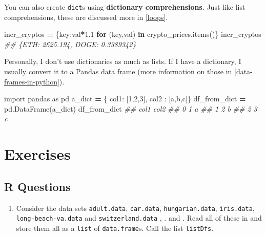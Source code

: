 \documentclass[
  12pt,
  krantz2]{krantz}
\makeatletter
\newenvironment{Shaded}{\begin{snugshade}}{\end{snugshade}}
\newcommand{\CommentTok}[1]{\textcolor[rgb]{0.37,0.37,0.37}{\textit{#1}}}
\newcommand{\ControlFlowTok}[1]{\textcolor[rgb]{0.27,0.27,0.27}{\textbf{#1}}}
\newcommand{\DecValTok}[1]{\textcolor[rgb]{0.06,0.06,0.06}{#1}}
\newcommand{\FloatTok}[1]{\textcolor[rgb]{0.06,0.06,0.06}{#1}}
\newcommand{\ImportTok}[1]{#1}
\newcommand{\KeywordTok}[1]{\textcolor[rgb]{0.27,0.27,0.27}{\textbf{#1}}}
\newcommand{\NormalTok}[1]{#1}
\newcommand{\OperatorTok}[1]{\textcolor[rgb]{0.43,0.43,0.43}{\textbf{#1}}}
\newcommand{\StringTok}[1]{\textcolor[rgb]{0.5,0.5,0.5}{#1}}
\providecommand{\tightlist}{%
  \setlength{\itemsep}{0pt}\setlength{\parskip}{0pt}}
\newenvironment{kframe}{%
\medskip{}
\setlength{\fboxsep}{.8em}
 \def\at@end@of@kframe{}%
 \ifinner\ifhmode%
  \def\at@end@of@kframe{\end{minipage}}%
  \begin{minipage}{\columnwidth}%
 \fi\fi%
 \def\FrameCommand##1{\hskip\@totalleftmargin \hskip-\fboxsep
 \colorbox{shadecolor}{##1}\hskip-\fboxsep
     \hskip-\linewidth \hskip-\@totalleftmargin \hskip\columnwidth}%
 \MakeFramed {\advance\hsize-\width
   \@totalleftmargin\z@ \linewidth\hsize
   \@setminipage}}%
 {\par\unskip\endMakeFramed%
 \at@end@of@kframe}
\renewenvironment{Shaded}{\begin{kframe}}{\end{kframe}}
\makeatother
\begin{document}
You can also create \texttt{dict}s using \textbf{dictionary comprehensions}. Just like list comprehensions, these are discussed more in \ref{loops}.

\begin{Shaded}
\begin{Highlighting}[]
\NormalTok{incr\_cryptos }\OperatorTok{=}\NormalTok{ \{key:val}\OperatorTok{*}\FloatTok{1.1} \ControlFlowTok{for}\NormalTok{ (key,val) }\KeywordTok{in}\NormalTok{ crypto\_prices.items()\}}
\NormalTok{incr\_cryptos}
\CommentTok{\#\# \{\textquotesingle{}ETH\textquotesingle{}: 2625.194, \textquotesingle{}DOGE\textquotesingle{}: 0.3389342\}}
\end{Highlighting}
\end{Shaded}

Personally, I don't use dictionaries as much as lists. If I have a dictionary, I usually convert it to a Pandas data frame (more information on those in \ref{data-frames-in-python}).

\begin{Shaded}
\begin{Highlighting}[]
\ImportTok{import}\NormalTok{ pandas }\ImportTok{as}\NormalTok{ pd}
\NormalTok{a\_dict }\OperatorTok{=}\NormalTok{ \{ }\StringTok{\textquotesingle{}col1\textquotesingle{}}\NormalTok{: [}\DecValTok{1}\NormalTok{,}\DecValTok{2}\NormalTok{,}\DecValTok{3}\NormalTok{], }\StringTok{\textquotesingle{}col2\textquotesingle{}}\NormalTok{ : [}\StringTok{\textquotesingle{}a\textquotesingle{}}\NormalTok{,}\StringTok{\textquotesingle{}b\textquotesingle{}}\NormalTok{,}\StringTok{\textquotesingle{}c\textquotesingle{}}\NormalTok{]\}}
\NormalTok{df\_from\_dict }\OperatorTok{=}\NormalTok{ pd.DataFrame(a\_dict)}
\NormalTok{df\_from\_dict}
\CommentTok{\#\#    col1 col2}
\CommentTok{\#\# 0     1    a}
\CommentTok{\#\# 1     2    b}
\CommentTok{\#\# 2     3    c}
\end{Highlighting}
\end{Shaded}

\hypertarget{exercises-3}{%
\section{Exercises}\label{exercises-3}}

\hypertarget{r-questions-3}{%
\subsection{R Questions}\label{r-questions-3}}

\begin{enumerate}
\def\labelenumi{\arabic{enumi}.}
\tightlist
\item
  Consider the data sets \texttt{adult.data}, \texttt{car.data}, \texttt{hungarian.data}, \texttt{iris.data}, \texttt{long-beach-va.data} and \texttt{switzerland.data} \citep{misc_heart_disease_45}, \citep{misc_iris_53}. \citep{misc_adult_2} and \citep{misc_car_evaluation_19}. Read all of these in and store them all as a \texttt{list} of \texttt{data.frame}s. Call the list \texttt{listDfs}.
\end{enumerate}
\end{document}
